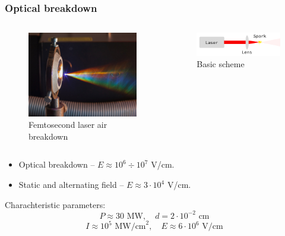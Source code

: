 \documentclass{beamer}
\begin{document}
	\begin{frame}
		\frametitle{Optical breakdown}
		\begin{columns}
			\begin{figure}
				\centering
				\includegraphics[width=1.05\linewidth]{res/new_femtosecond_laser_spark.jpg}
				\caption*{Femtosecond laser air breakdown}
			\end{figure}
			
			\begin{figure}
				\centering
				\includegraphics[width=1.0\linewidth]{res/scheme.png}
				\caption*{Basic scheme}
			\end{figure}
			
			
		\end{columns}
		\begin{itemize}
			\item Optical breakdown -- $E \approx 10^6 \div 10^7$ V/cm. 
			\item Static and alternating field -- $E \approx 3 \cdot 10^4$ V/cm.
		\end{itemize}
		Charachteristic parameters:
		$$ P \approx 30 \text{ MW}, \quad d = 2 \cdot 10^{-2} \text{ cm} $$
		$$ I \approx 10^5 \text{ MW/cm}^2, \quad E \approx 6 \cdot 10^6 \text{ V/cm} $$
		
		
		
	\end{frame}
	
\end{document}
